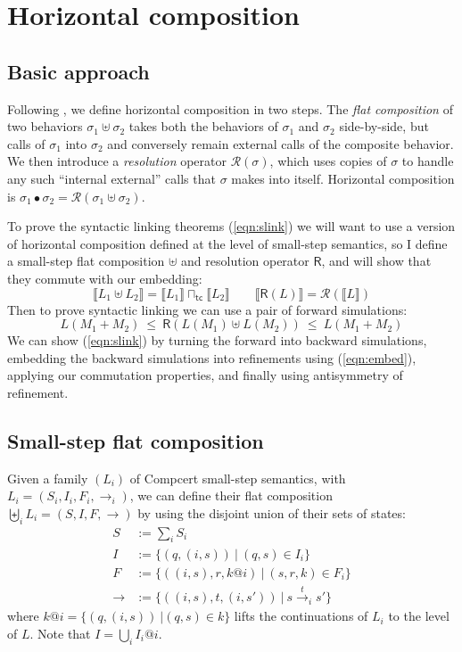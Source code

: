 \documentclass[11pt]{article}
\newcommand{\kw}[1]{{\mathsf{#1}}}
\begin{document}
\section{Horizontal composition}
\label{sec:hcomp}

\subsection{Basic approach}

Following \cite{cpp15},
we define horizontal composition in two steps.
The \emph{flat composition} of two behaviors $\sigma_1 \uplus \sigma_2$
takes both the behaviors of $\sigma_1$ and $\sigma_2$ side-by-side,
but calls of $\sigma_1$ into $\sigma_2$ and conversely remain
external calls of the composite behavior.
We then introduce a \emph{resolution} operator $\mathcal{R}(\sigma)$,
which uses copies of $\sigma$ to handle any such ``internal external'' calls
that $\sigma$ makes into itself.
Horizontal composition is
$\sigma_1 \bullet \sigma_2 = \mathcal{R}(\sigma_1 \uplus \sigma_2)$.

To prove the syntactic linking theorems (\ref{eqn:slink})
we will want to use a version of horizontal composition
defined at the level of small-step semantics,
so I define a small-step flat composition $\uplus$
and resolution operator $\kw{R}$,
and will show that they commute with our embedding:
\[
  \llbracket L_1 \uplus L_2 \rrbracket =
    \llbracket L_1 \rrbracket \sqcap_\kw{tc}
    \llbracket L_2 \rrbracket
  \qquad
  \llbracket \kw{R}(L) \rrbracket =
    \mathcal{R}(\llbracket L \rrbracket)
\]
Then to prove syntactic linking we can use a pair of forward simulations:
\[
  L(M_1 + M_2) \ \le\  \kw{R}(L(M_1) \uplus L(M_2)) \ \le\  L(M_1 + M_2)
\]
We can show (\ref{eqn:slink}) by
turning the forward into backward simulations,
embedding the backward simulations into refinements using (\ref{eqn:embed}),
applying our commutation properties, and
finally using antisymmetry of refinement.

\subsection{Small-step flat composition}

Given a family $(L_i)$ of Compcert small-step semantics,
with $L_i = (S_i, I_i, F_i, {\rightarrow_i})$,
we can define their flat composition $\biguplus_i L_i = (S, I, F, {\rightarrow})$
by using the disjoint union of their sets of states:
\begin{align*}
  S &:= \sum_i S_i \\
  I &:= \{ (q, (i, s)) \: \vert \: (q, s) \in I_i \} \\
  F &:= \{ ((i, s), r, k@i) \: \vert \: (s, r, k) \in F_i \} \\
  {\rightarrow} &:= \{ ((i, s), t, (i, s')) \: \vert \: s
\stackrel{t}{\rightarrow}_i s' \}
\end{align*}
where $k@i = \{ (q, (i, s)) \: \vert (q, s) \in k \}$
lifts the continuations of $L_i$ to the level of $L$.
Note that $I = \bigcup_i I_i@i$.
\end{document}
